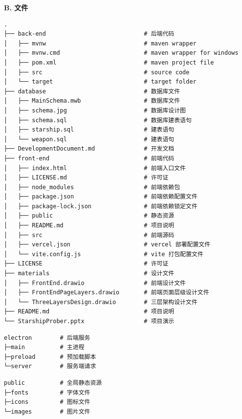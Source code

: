 \documentclass{base}
\numberwithin{figure}{section} %
\begin{document}
\textbf{B. 文件}

\begin{verbatim}
.
├── back-end                            # 后端代码
│   ├── mvnw                            # maven wrapper
│   ├── mvnw.cmd                        # maven wrapper for windows
│   ├── pom.xml                         # maven project file
│   ├── src                             # source code
│   └── target                          # target folder
├── database                            # 数据库文件
│   ├── MainSchema.mwb                  # 数据库文件
│   ├── schema.jpg                      # 数据库设计图
│   ├── schema.sql                      # 数据库建表语句
│   ├── starship.sql                    # 建表语句
│   └── weapon.sql                      # 建表语句
├── DevelopmentDocument.md              # 开发文档
├── front-end                           # 前端代码
│   ├── index.html                      # 前端入口文件
│   ├── LICENSE.md                      # 许可证
│   ├── node_modules                    # 前端依赖包
│   ├── package.json                    # 前端依赖配置文件
│   ├── package-lock.json               # 前端依赖锁定文件
│   ├── public                          # 静态资源
│   ├── README.md                       # 项目说明
│   ├── src                             # 前端源码
│   ├── vercel.json                     # vercel 部署配置文件
│   └── vite.config.js                  # vite 打包配置文件
├── LICENSE                             # 许可证
├── materials                           # 设计文件
│   ├── FrontEnd.drawio                 # 前端设计文件
│   ├── FrontEndPageLayers.drawio       # 前端页面层级设计文件
│   └── ThreeLayersDesign.drawio        # 三层架构设计文件
├── README.md                           # 项目说明
└── StarshipProber.pptx                 # 项目演示
\end{verbatim}

\begin{verbatim}
electron        # 后端服务
├─main          # 主进程
├─preload       # 预加载脚本
└─server        # 服务端请求
\end{verbatim}

\begin{verbatim}
public          # 全局静态资源
├─fonts         # 字体文件
├─icons         # 图标文件
└─images        # 图片文件
\end{verbatim}
\end{document}
